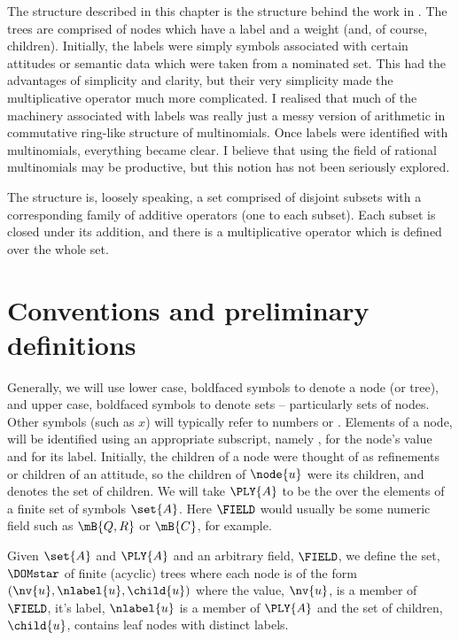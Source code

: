 The structure described in this chapter is the structure behind the
work in \Cfive.  The trees are comprised of
nodes which have a label and a weight (and, of course, children).
Initially, the labels were simply symbols associated with certain
attitudes or semantic data which were taken from a nominated set.
This had the advantages of simplicity and clarity, but their very
simplicity made the multiplicative operator much more complicated. I
realised that much of the machinery associated with labels was really
just a messy version of arithmetic in commutative ring-like structure of
multinomials. Once labels were identified with multinomials, everything became
clear.  I believe that using the field of rational multinomials
may be productive, but this notion has not been seriously explored.

The structure is, loosely speaking, a set comprised of disjoint
subsets with a corresponding family of additive operators (one to
each subset). Each subset is closed under its addition, and there is a
multiplicative operator which is defined over the whole set.

\section{Conventions and preliminary definitions}

Generally, we will use lower case, boldfaced symbols to denote a node
(or tree), and upper case, boldfaced symbols to denote sets  -- 
particularly sets of nodes.  Other symbols (such as \(x\)) will
typically refer to numbers or \polyrat \polyforms. Elements of a
node,  will be identified using an appropriate subscript,
namely , for the node's value and  for its
label. Initially, the children of a node were thought of as
refinements or children of an attitude, so the children of $\node{u}$
were its children, and  denotes the set of children.  We will
take $\PLY{A}$ to be the \polytypes over the elements of a finite set
of symbols $\set{A}$.  Here $\FIELD$ would usually be some numeric
field such as $\mB{Q, R}$ or $\mB{C}$, for example.

\begin{definition}\label{def-of-dom}
  Given $\set{A}$ and $\PLY{A}$ and an arbitrary field, $\FIELD$, we
  define the set, $\DOMstar$ of finite (acyclic) trees where each node is
  of the form $(\nv{u}, \nlabel{u}, \child{u})$ where the value,
  $\nv{u}$, is a member of $\FIELD$, it's label, $\nlabel{u}$ is
  a member of $\PLY{A}$ and the set of children, $\child{u}$, contains
  leaf nodes with distinct labels.
\end{definition}

